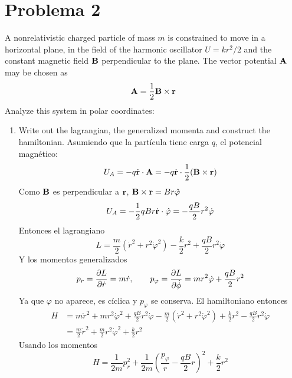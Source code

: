 \documentclass[]{article}
\numberwithin{equation}{section}
\begin{document}
\section{Problema 2}
A nonrelativistic charged particle of mass $m$ is constrained to move in a horizontal plane, in the field of the harmonic oscillator $U = kr^2/2$ and the constant magnetic field $\mathbf{B}$ perpendicular to the plane. The vector potential $\mathbf{A}$ may be chosen as
\begin{equation}
	\mathbf{A} = \frac{1}{2} \mathbf{B}\times\mathbf{r}
\end{equation}
Analyze this system in polar coordinates:
\begin{enumerate}
	\item[a.] Write out the lagrangian, the generalized momenta and construct the hamiltonian.
	\resp Asumiendo que la partícula tiene carga $q$, el potencial magnético:
	\begin{equation*}
		U_A = - q \dot{\mathbf{r}}\cdot\mathbf{A} = - q \dot{\mathbf{r}}\cdot\frac{1}{2} (\mathbf{B}\times\mathbf{r})
	\end{equation*}
	Como $\mathbf{B}$ es perpendicular a $\mathbf{r}$, $\mathbf{B}\times\mathbf{r} = B r \hat{\mathbf{\varphi}}$
	\begin{equation}
		U_A = - \frac{1}{2} q B r \dot{\mathbf{r}}\cdot\hat{\mathbf{\varphi}} = - \frac{q B}{2} r^2 \dot{\varphi}
	\end{equation}
	Entonces el lagrangiano
	\begin{equation}
		L = \frac{m}{2} \left(\dot{r}^2 + r^2 \dot{\varphi}^2\right) - \frac{ k}{2} r^2 + \frac{q B}{2} r^2 \dot{\varphi}
	\end{equation}
	Y los momentos generalizados
	\begin{equation}
		p_r = \dfrac{\partial L}{\partial \dot{r}} = m\dot{r}, \qquad p_\varphi = \dfrac{\partial L}{\partial \dot{\phi}} = m r^2 \dot{\varphi} + \frac{q B}{2} r^2
	\end{equation}
	Ya que $\varphi$ no aparece, es cíclica y $p_{\varphi}$ se conserva. El hamiltoniano entonces
	\begin{align*}
		H &= m \dot{r}^2 + m r^2 \dot{\varphi}^2 + \frac{q B }{2} r^2 \dot{\varphi} - \frac{m}{2} \left(\dot{r}^2 + r^2 \dot{\varphi}^2\right) + \frac{k}{2} r^2 - \frac{q B }{2} r^2 \dot{\varphi}\\
		&= \frac{m }{2} \dot{r}^2 + \frac{m }{2} r^2 \dot{\varphi}^2 + \frac{k}{2} r^2
	\end{align*}
	Usando los momentos
	\begin{equation}
		H = \frac{1}{2 m} p_r^2 + \frac{1}{2 m} \left(\frac{p_\varphi}{r} - \frac{ q B}{2} r\right)^2 + \frac{k}{2} r^2
	\end{equation}
	

\end{enumerate}
\end{document}
